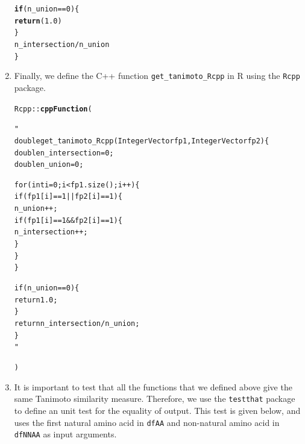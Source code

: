 \documentclass[a4paper,11pt]{article}\usepackage[]{graphicx}\usepackage[]{xcolor}
\makeatletter
\newcommand{\hlnum}[1]{\textcolor[rgb]{0.686,0.059,0.569}{#1}}%
\newcommand{\hlsng}[1]{\textcolor[rgb]{0.192,0.494,0.8}{#1}}%
\newcommand{\hlopt}[1]{\textcolor[rgb]{0,0,0}{#1}}%
\newcommand{\hldef}[1]{\textcolor[rgb]{0.345,0.345,0.345}{#1}}%
\newcommand{\hlkwa}[1]{\textcolor[rgb]{0.161,0.373,0.58}{\textbf{#1}}}%
\newcommand{\hlkwd}[1]{\textcolor[rgb]{0.737,0.353,0.396}{\textbf{#1}}}%
\newenvironment{kframe}{%
 \def\at@end@of@kframe{}%
 \ifinner\ifhmode%
  \def\at@end@of@kframe{\end{minipage}}%
  \begin{minipage}{\columnwidth}%
 \fi\fi%
 \def\FrameCommand##1{\hskip\@totalleftmargin \hskip-\fboxsep
 \colorbox{shadecolor}{##1}\hskip-\fboxsep
     \hskip-\linewidth \hskip-\@totalleftmargin \hskip\columnwidth}%
 \MakeFramed {\advance\hsize-\width
   \@totalleftmargin\z@ \linewidth\hsize
   \@setminipage}}%
 {\par\unskip\endMakeFramed%
 \at@end@of@kframe}
\newenvironment{knitrout}{}{} %
\newcommand{\code}[1]{\texttt{#1}}
\makeatother
\begin{document}
\begin{enumerate}
\begin{knitrout}
\begin{kframe}
\begin{alltt}
  \hlkwa{if} \hldef{(n_union} \hlopt{==} \hlnum{0}\hldef{) \{}
    \hlkwd{return}\hldef{(}\hlnum{1.0}\hldef{)}
  \hldef{\}}
  \hldef{n_intersection} \hlopt{/} \hldef{n_union}
\hldef{\}}
\end{alltt}
\end{kframe}
\end{knitrout}




\item Finally, we define the C++ function \code{get\_tanimoto\_Rcpp} in R using the \code{Rcpp} package. 

\begin{knitrout}
\color{fgcolor}\begin{kframe}
\begin{alltt}
\hldef{Rcpp}\hlopt{::}\hlkwd{cppFunction}\hldef{(}\hlsng{"
double get_tanimoto_Rcpp(IntegerVector fp1, IntegerVector fp2) \{
    double n_intersection = 0; 
    double n_union = 0; 
    
    for (int i = 0; i < fp1.size(); i++) \{
        if (fp1[i] == 1 || fp2[i] == 1) \{
            n_union++;
            if (fp1[i] == 1 && fp2[i] == 1) \{
                n_intersection++;
            \}
        \}
    \}
    
    if (n_union == 0) \{
        return 1.0; 
    \}
    return n_intersection / n_union; 
\}                 
"}\hldef{)}
\end{alltt}
\end{kframe}
\end{knitrout}




\item It is important to test that all the functions that we defined above give the same Tanimoto similarity measure. Therefore, we use the \code{testthat} package to define an unit test for the equality of output. This test is given below, and uses the first natural amino acid in \code{dfAA} and non-natural amino acid in \code{dfNNAA} as input arguments. 


\end{enumerate}
\end{document}
